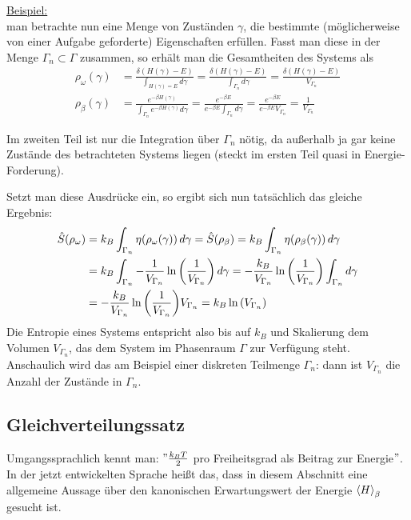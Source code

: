 \underline{Beispiel:}\\
man betrachte nun eine Menge von Zuständen $\gamma$, die bestimmte (möglicherweise von einer Aufgabe geforderte) Eigenschaften erfüllen. Fasst man diese in der Menge $\Gamma_n \subset \Gamma$ zusammen, so erhält man die Gesamtheiten des Systems als
\begin{align}\label{key}
\rho_\omega(\gamma) &= \frac{\delta(H(\gamma) - E)}{\int_{H(\gamma) = E} d\gamma} = \frac{\delta(H(\gamma) - E)}{\int_{\Gamma_n} d\gamma} = \frac{\delta(H(\gamma) - E)}{V_{\Gamma_n}}
\\
\rho_\beta(\gamma) &= \frac{e^{-\beta H(\gamma)}}{\int_{\Gamma_n} e^{-\beta H(\gamma)} d\gamma} = \frac{e^{-\beta E}}{e^{-\beta E} \int_{\Gamma_n} d\gamma} = \frac{e^{-\beta E}}{e^{-\beta E} V_{\Gamma_n}} = \frac{1}{V_{\Gamma_n}}
\end{align}

Im zweiten Teil ist nur die Integration über $\Gamma_n$ nötig, da außerhalb ja gar keine Zustände des betrachteten Systems liegen (steckt im ersten Teil quasi in Energie-Forderung).

Setzt man diese Ausdrücke ein, so ergibt sich nun tatsächlich das gleiche Ergebnis:
\begin{align}\label{key}
\hat{S}(\rho_\omega) &= k_B \int_{\Gamma_n} \eta\qty(\rho_\omega(\gamma)) \, d\gamma = \hat{S}(\rho_\beta) = k_B \int_{\Gamma_n} \eta\qty(\rho_\beta(\gamma)) \, d\gamma
\notag\\
&= k_B \int_{\Gamma_n} -\frac{1}{V_{\Gamma_n}} \ln\qty(\frac{1}{V_{\Gamma_n}}) \, d\gamma = -\frac{k_B}{V_{\Gamma_n}} \ln\qty(\frac{1}{V_{\Gamma_n}}) \int_{\Gamma_n} d\gamma
\notag\\
&= -\frac{k_B}{V_{\Gamma_n}} \ln\qty(\frac{1}{V_{\Gamma_n}}) V_{\Gamma_n} = k_B \ln\qty(V_{\Gamma_n})
\end{align}
Die Entropie eines Systems entspricht also bis auf $k_B$ und Skalierung dem Volumen $V_{\Gamma_n}$, das dem System im Phasenraum $\Gamma$ zur Verfügung steht. Anschaulich wird das am Beispiel einer diskreten Teilmenge $\Gamma_n$: dann ist $V_{\Gamma_n}$ die Anzahl der Zustände in $\Gamma_n$.



	\subsection{Gleichverteilungssatz}
Umgangssprachlich kennt man: $" \frac{k_B T}{2}$ pro Freiheitsgrad als Beitrag zur Energie$"$.\\
In der jetzt entwickelten Sprache heißt das, dass in diesem Abschnitt eine allgemeine Aussage über den kanonischen Erwartungswert der Energie $\expval{H}_\beta$ gesucht ist.

